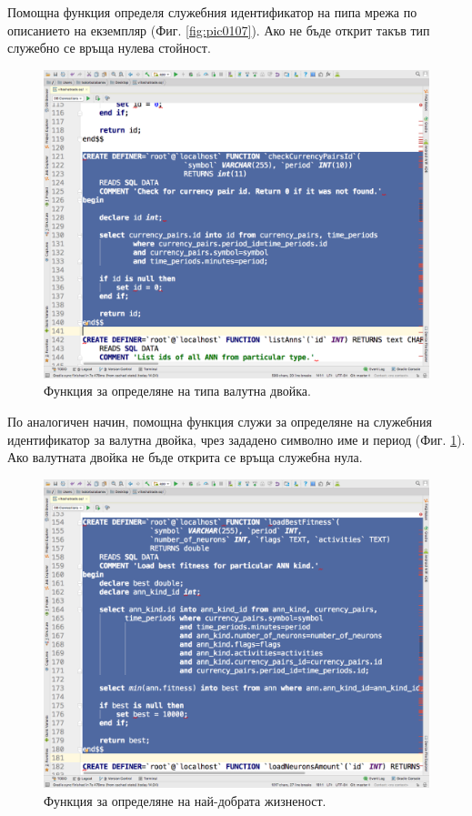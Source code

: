 \documentclass[book,14pt,oneside,openany]{memoir}
\begin{document}
Помощна функция определя служебния идентификатор на пипа мрежа по описанието на екземпляр (Фиг. \ref{fig:pic0107}). Ако не бъде открит такъв тип служебно се връща нулева стойност. 

\begin{figure}[h]
  \centering
  \includegraphics[height=0.45\pdfpageheight]{pic0108}
  \caption{Функция за определяне на типа валутна двойка.}
\label{fig:pic0108}
\end{figure}
\FloatBarrier

По аналогичен начин, помощна функция служи за определяне на служебния идентификатор за валутна двойка, чрез зададено символно име и период (Фиг. \ref{fig:pic0108}). Ако валутната двойка не бъде открита се връща служебна нула. 

\begin{figure}[h]
  \centering
  \includegraphics[height=0.45\pdfpageheight]{pic0109}
  \caption{Функция за определяне на най-добрата жизненост.}
\label{fig:pic0109}
\end{figure}
\FloatBarrier
\end{document}
